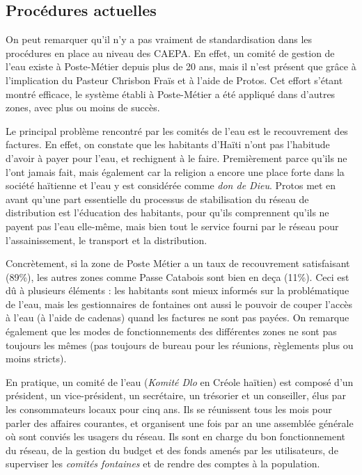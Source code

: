 \documentclass{EPL-master-thesis-covers-FR}
\begin{document}


			\subsection*{Procédures actuelles}
				\label{sec:procedures_actuelles}

				On peut remarquer qu'il n'y a pas vraiment de standardisation dans les procédures en place au niveau des CAEPA. En effet, un comité de gestion de l'eau existe à Poste-Métier depuis plus de 20 ans, mais il n'est présent que grâce à l'implication du Pasteur Chrisbon Fraïs et à l'aide de Protos. Cet effort s'étant montré efficace, le système établi à Poste-Métier a été appliqué dans d'autres zones, avec plus ou moins de succès.

				Le principal problème rencontré par les comités de l'eau est le recouvrement des factures. En effet, on constate que les habitants d'Haïti n'ont pas l'habitude d'avoir à payer pour l'eau, et rechignent à le faire. Premièrement parce qu'ils ne l'ont jamais fait, mais également car la religion a encore une place forte dans la société haïtienne et l'eau y est considérée comme \emph{don de Dieu}. Protos met en avant qu'une part essentielle du processus de stabilisation du réseau de distribution est l'éducation des habitants, pour qu'ils comprennent qu'ils ne payent pas l'eau elle-même, mais bien tout le service fourni par le réseau pour l'assainissement, le transport et la distribution.

				Concrètement, si la zone de Poste Métier a un taux de recouvrement satisfaisant (89\%), les autres zones comme Passe Catabois sont bien en deça (11\%). Ceci est dû à plusieurs éléments : les habitants sont mieux informés sur la problématique de l'eau, mais les gestionnaires de fontaines ont aussi le pouvoir de couper l'accès à l'eau (à l'aide de cadenas) quand les factures ne sont pas payées. On remarque également que les modes de fonctionnements des différentes zones ne sont pas toujours les mêmes (pas toujours de bureau pour les réunions, règlements plus ou moins stricts).

				En pratique, un comité de l'eau (\emph{Komité Dlo} en Créole haïtien) est composé d'un président, un vice-président, un secrétaire, un trésorier et un conseiller, élus par les consommateurs locaux pour cinq ans. Ils se réunissent tous les mois pour parler des affaires courantes, et organisent une fois par an une assemblée générale où sont conviés les usagers du réseau. Ils sont en charge du bon fonctionnement du réseau, de la gestion du budget et des fonds amenés par les utilisateurs, de superviser les \emph{comités fontaines} et de rendre des comptes à la population.
\end{document}
